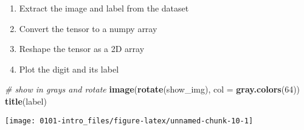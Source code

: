 \documentclass[]{book}
\newenvironment{Shaded}{\begin{snugshade}}{\end{snugshade}}
\newcommand{\CommentTok}[1]{\textcolor[rgb]{0.56,0.35,0.01}{\textit{#1}}}
\newcommand{\ControlFlowTok}[1]{\textcolor[rgb]{0.13,0.29,0.53}{\textbf{#1}}}
\newcommand{\DataTypeTok}[1]{\textcolor[rgb]{0.13,0.29,0.53}{#1}}
\newcommand{\DecValTok}[1]{\textcolor[rgb]{0.00,0.00,0.81}{#1}}
\newcommand{\KeywordTok}[1]{\textcolor[rgb]{0.13,0.29,0.53}{\textbf{#1}}}
\newcommand{\NormalTok}[1]{#1}
\newcommand{\OperatorTok}[1]{\textcolor[rgb]{0.81,0.36,0.00}{\textbf{#1}}}
\newcommand{\StringTok}[1]{\textcolor[rgb]{0.31,0.60,0.02}{#1}}
\providecommand{\tightlist}{%
  \setlength{\itemsep}{0pt}\setlength{\parskip}{0pt}}
\begin{document}
\begin{enumerate}
\def\labelenumi{\arabic{enumi}.}
\tightlist
\item
  Extract the image and label from the dataset
\item
  Convert the tensor to a numpy array
\item
  Reshape the tensor as a 2D array
\item
  Plot the digit and its label
\end{enumerate}

\begin{Shaded}
\end{Shaded}

\begin{Shaded}
\begin{Highlighting}[]
\CommentTok{# show in grays and rotate}
\KeywordTok{image}\NormalTok{(}\KeywordTok{rotate}\NormalTok{(show_img), }\DataTypeTok{col =} \KeywordTok{gray.colors}\NormalTok{(}\DecValTok{64}\NormalTok{))}
\KeywordTok{title}\NormalTok{(label)}
\end{Highlighting}
\end{Shaded}

\begin{center}\texttt{[image: 0101-intro\_files/figure-latex/unnamed-chunk-10-1]} \end{center}
\end{document}

